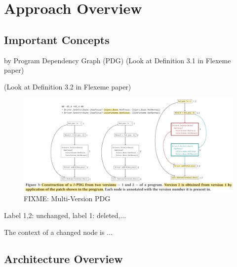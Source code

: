 \section{Approach Overview}
\label{overview:sec}

\subsection{Important Concepts}
\label{concepts:sec}

\begin{Definition}
  by Program Dependency Graph (PDG)
  (Look at Definition 3.1 in Flexeme paper)
\end{Definition}

\begin{Definition}
(Look at Definition 3.2 in Flexeme paper)
\end{Definition}

\begin{figure}[t]
	\centering
        \includegraphics[width=5.3in]{figures/multi-version-graph.png}
        \vspace{-6pt}
	\caption{FIXME: Multi-Version PDG}
	\label{fig:pdg}
\end{figure}

\begin{Definition}
Label 1,2: unchanged, label 1: deleted,...
\end{Definition}


\begin{Definition}[Context]
The context of a changed node is ...
\end{Definition}

\subsection{Architecture Overview}
